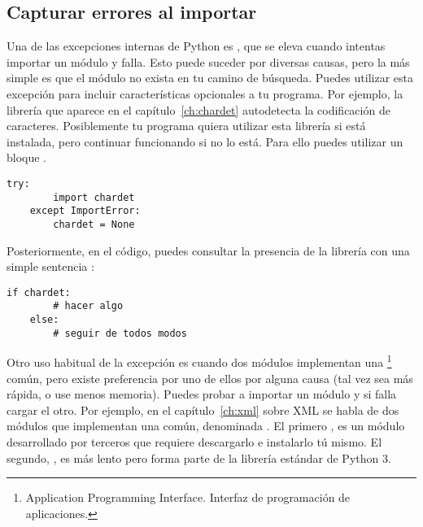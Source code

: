\subsection {Capturar errores al importar}

Una de las excepciones internas de Python es , que se eleva cuando intentas importar un módulo y falla. Esto puede suceder por diversas causas, pero la más simple es que el módulo no exista en tu camino de búsqueda. Puedes utilizar esta excepción para incluir características opcionales a tu programa. Por ejemplo, la librería  que aparece en el capítulo~\ref{ch:chardet} autodetecta la codificación de caracteres. Posiblemente tu programa quiera utilizar esta librería si está instalada, pero continuar funcionando si no lo está. Para ello puedes utilizar un bloque .

\noindent\begin{minipage}{\textwidth}
\begin{lstlisting}[mathescape=True]
    try:
        import chardet
    except ImportError:
        chardet = None
\end{lstlisting}
\end{minipage}

Posteriormente, en el código, puedes consultar la presencia de la librería con una simple sentencia :

\noindent\begin{minipage}{\textwidth}
\begin{lstlisting}[mathescape=True]
    if chardet:
        # hacer algo
    else:
        # seguir de todos modos
\end{lstlisting}
\end{minipage}

Otro uso habitual de la excepción  es cuando dos módulos implementan una \footnote{Application Programming Interface. Interfaz de programación de aplicaciones.} común, pero existe preferencia por uno de ellos por alguna causa (tal vez sea más rápida, o use menos memoria). Puedes probar a importar un módulo y si falla cargar el otro. Por ejemplo, en el capítulo~\ref{ch:xml} sobre XML se habla de dos módulos que implementan una  común, denominada . El primero , es un módulo desarrollado por terceros que requiere descargarlo e instalarlo tú mismo. El segundo, , es más lento pero forma parte de la librería estándar de Python 3.

